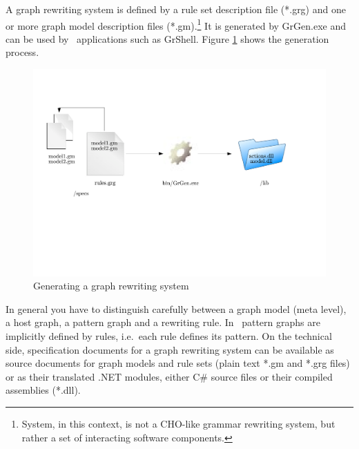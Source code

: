 A graph rewriting system is defined by a rule set description file (*.grg) and one or more graph model description files (*.gm).\footnote{System, in this context, is not a CHO-like grammar rewriting system, but rather a set of interacting software components.} It is generated by GrGen.exe and can be used by \GrG\ applications such as GrShell. Figure \ref{process} shows the generation process.
\begin{figure}[htbp]
  \centering
  \includegraphics[width=\textwidth]{fig/process}
  \caption{Generating a graph rewriting system}
  \label{process}
\end{figure}

In general you have to distinguish carefully between a graph model (meta level), a host graph, a pattern graph and a rewriting rule. In \GrG\ pattern graphs are implicitly defined by rules, i.e.\ each rule defines its pattern. On the technical side, specification documents for a graph rewriting system can be available as source documents for graph models and rule sets (plain text *.gm and *.grg files) or as their translated .NET modules, either C\# source files or their compiled assemblies (*.dll).
